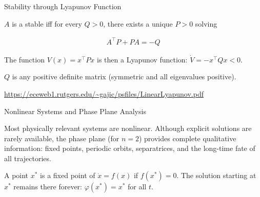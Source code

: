 \documentclass[aspectratio=169,xcolor=dvipsnames,svgnames,x11names,fleqn]{beamer}
\begin{document}
\begin{frame}{Stability through Lyapunov Function}

    
    $A$ is a stable iff for every $Q>0$, there exists a unique $P>0$ solving

    \begin{tcolorbox}[
        enhanced,
        rounded corners,
        boxrule=0.5pt, 
        leftrule=2mm, 
        colframe=vcGold!10!purple,
        colback=WarmWhite,
        notitle,
        left=1mm 
    ]
        \begin{align*}
            A^\top  P + PA = -Q
        \end{align*}
    \end{tcolorbox}
    \vspace{10pt}

    The function $V(x) = x^\top P x$ is then a Lyapunov function: $\dot{V} = -x^\top Q x < 0$.

    \vspace{5pt}

    $Q$ is any positive definite matrix (symmetric and all eigenvalues positive).

    \vspace{5pt}

    \scriptsize

    \url{https://eceweb1.rutgers.edu/~gajic/psfiles/LinearLyapunov.pdf}

\end{frame}

\begin{frame}{Nonlinear Systems and Phase Plane Analysis}

    Most physically relevant systems are nonlinear. Although explicit solutions are rarely available, the phase plane (for $n=2$) provides complete qualitative information: fixed points, periodic orbits, separatrices, and the long-time fate of all trajectories.

        \begin{tcolorbox}[
        enhanced,
        rounded corners,
        boxrule=0.5pt, 
        leftrule=2mm, 
        colframe=vcGold!30!Green,
        colback=WarmWhite,
        notitle,
        left=1mm 
    ]

    A point $x^*$ is a fixed point of $\dot{x} = f(x)$ if $f(x^*) = 0$. The solution starting at $x^*$ remains there forever: $\varphi(x^*) = x^*$ for all $t$.

    \end{tcolorbox}    
\end{frame}
\end{document}
